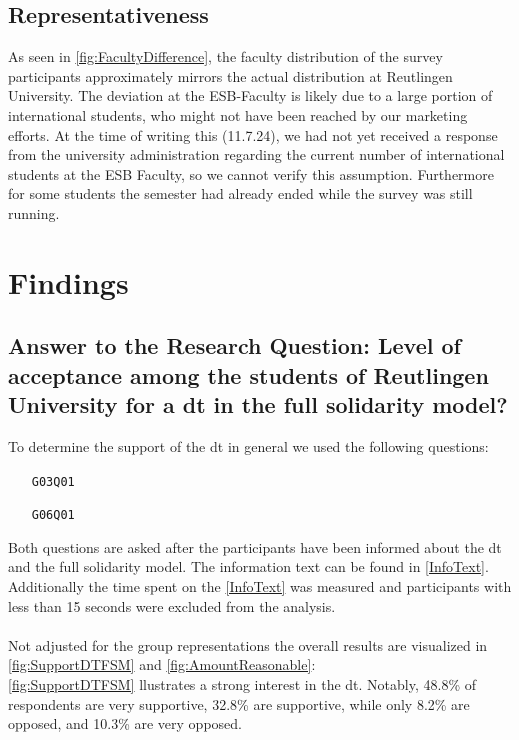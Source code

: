 \subsection{Representativeness}
\begin{multicols}{1}
    
    \columnbreak
    {
        As seen in \ref{fig:FacultyDifference}, the faculty distribution of the survey participants approximately mirrors the actual distribution at Reutlingen University.
        The deviation at the ESB-Faculty is likely due to a large portion of international students, who might not have been reached by our marketing efforts. At the time of writing this (11.7.24), we had not yet received a response from the university administration regarding the current number of international students at the ESB Faculty, so we cannot verify this assumption.
        Furthermore for some students the semester had already ended while the survey was still running.
    }
\end{multicols}

\pagebreak
\section{Findings}
\subsection{Answer to the Research Question: Level of acceptance among the students of Reutlingen University for a \gls{dt} in the full solidarity model?}
\begin{center}
\end{center}

To determine the support of the \gls{dt} in general we used the following questions:

\begin{enumerate}
    \item[\texttt{G03Q01}] 
    \item[\texttt{G06Q01}] 
\end{enumerate}
Both questions are asked after the participants have been informed about the \gls{dt} and the full solidarity model. The information text can be found in \ref{InfoText}. Additionally the time spent on the \ref*{InfoText} was measured and participants with less than 15 seconds were excluded from the analysis.\\\\
Not adjusted for the group representations the overall results are visualized in \ref{fig:SupportDTFSM} and \ref{fig:AmountReasonable}:\\
\ref{fig:SupportDTFSM} llustrates a strong interest in the \gls{dt}. Notably, 48.8\% of respondents are very supportive, 32.8\% are supportive, while only 8.2\% are opposed, and 10.3\% are very opposed.

